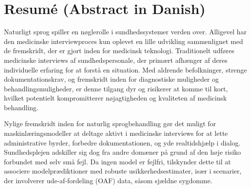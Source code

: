 
\chapter[resumé (abstract in danish)]{Resumé (Abstract in Danish)}

Naturligt sprog spiller en nøglerolle i sundhedssystemer verden over. Alligevel har den medicinske interviewproces kun oplevet en lille udvikling sammenlignet med de fremskridt, der er gjort inden for medicinsk teknologi.
Traditionelt udføres medicinske interviews af sundhedspersonale, der primært afhænger af deres individuelle erfaring for at forstå en situation.
Med aldrende befolkninger, strenge dokumentationskrav, og fremskridt inden for diagnostiske muligheder og behandlingsmuligheder, er denne tilgang dyr og risikerer at komme til kort, hvilket potentielt kompromitterer nøjagtigheden og kvaliteten af medicinsk behandling.

Nylige fremskridt inden for naturlig sprogbehandling gør det muligt for maskinlæringsmodeller at deltage aktivt i medicinske interviews for at lette administrative byrder, forbedre dokumentationen, og  yde realtidshjælp i dialog.
Sundhedsplejen adskiller sig dog fra andre domæner på grund af den høje risiko forbundet med selv små fejl. Da ingen model er fejlfri, tilskynder dette til at associere modelprædiktioner med robuste usikkerhedsestimater, især i scenarier, der involverer ude-af-fordeling (OAF) data, såsom sjældne sygdomme.

